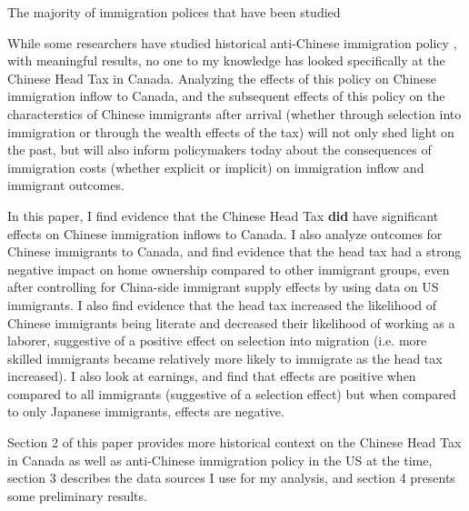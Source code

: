 The majority of immigration polices that have been studied 




While some researchers have studied historical anti-Chinese immigration policy \citep{Chen2015, ChenXie2020, Postel2023}, with meaningful results, no one to my knowledge has looked specifically at the Chinese Head Tax in Canada. Analyzing the effects of this policy on Chinese immigration inflow to Canada, and the subsequent effects of this policy on the characterstics of Chinese immigrants after arrival (whether through selection into immigration or through the wealth effects of the tax) will not only shed light on the past, but will also inform policymakers today about the consequences of immigration costs (whether explicit or implicit) on immigration inflow and immigrant outcomes.

In this paper, I find evidence that the Chinese Head Tax \textbf{did} have significant effects on Chinese immigration inflows to Canada. I also analyze outcomes for Chinese immigrants to Canada, and find evidence that the head tax had a strong negative impact on home ownership compared to other immigrant groups, even after controlling for China-side immigrant supply effects by using data on US immigrants. 
I also find evidence that the head tax increased the likelihood of Chinese immigrants being literate and decreased their likelihood of working as a laborer, suggestive of a positive effect on selection into migration (i.e. more skilled immigrants became relatively more likely to immigrate as the head tax increased). I also look at earnings, and find that effects are positive when compared to all immigrants (suggestive of a selection effect) but when compared to only Japanese immigrants, effects are negative.

Section 2 of this paper provides more historical context on the Chinese Head Tax in Canada as well as anti-Chinese immigration policy in the US at the time, section 3 describes the data sources I use for my analysis, and section 4 presents some preliminary results.
